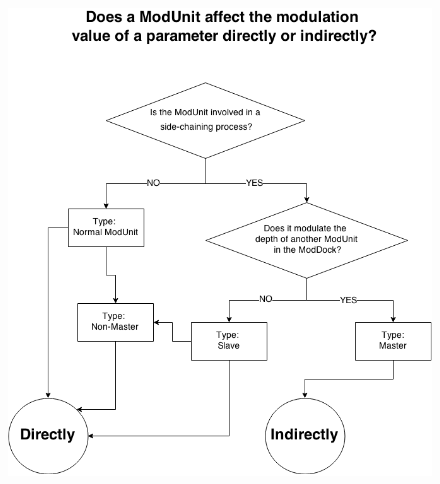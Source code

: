 \documentclass[12pt,twoside]{report}
\begin{document}
\begin{figure}[p!]
  \includegraphics[scale=0.7]{img/flowsc}
  \caption{}
  \label{fig:flowsc}
\end{figure}
\end{document}
